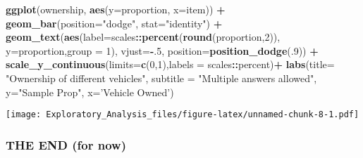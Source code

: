 \documentclass[]{article}
\newenvironment{Shaded}{\begin{snugshade}}{\end{snugshade}}
\newcommand{\KeywordTok}[1]{\textcolor[rgb]{0.13,0.29,0.53}{\textbf{#1}}}
\newcommand{\DataTypeTok}[1]{\textcolor[rgb]{0.13,0.29,0.53}{#1}}
\newcommand{\DecValTok}[1]{\textcolor[rgb]{0.00,0.00,0.81}{#1}}
\newcommand{\StringTok}[1]{\textcolor[rgb]{0.31,0.60,0.02}{#1}}
\newcommand{\OperatorTok}[1]{\textcolor[rgb]{0.81,0.36,0.00}{\textbf{#1}}}
\newcommand{\NormalTok}[1]{#1}
\begin{document}
\begin{Shaded}
\begin{Highlighting}[]
\KeywordTok{ggplot}\NormalTok{(ownership, }\KeywordTok{aes}\NormalTok{(}\DataTypeTok{y=}\NormalTok{proportion, }\DataTypeTok{x=}\NormalTok{item)) }\OperatorTok{+}\StringTok{ }
\StringTok{  }\KeywordTok{geom_bar}\NormalTok{(}\DataTypeTok{position=}\StringTok{"dodge"}\NormalTok{, }\DataTypeTok{stat=}\StringTok{"identity"}\NormalTok{) }\OperatorTok{+}
\StringTok{  }\KeywordTok{geom_text}\NormalTok{(}\KeywordTok{aes}\NormalTok{(}\DataTypeTok{label=}\NormalTok{scales}\OperatorTok{::}\KeywordTok{percent}\NormalTok{(}\KeywordTok{round}\NormalTok{(proportion,}\DecValTok{2}\NormalTok{)), }
                \DataTypeTok{y=}\NormalTok{proportion,}\DataTypeTok{group =} \DecValTok{1}\NormalTok{), }\DataTypeTok{vjust=}\OperatorTok{-}\NormalTok{.}\DecValTok{5}\NormalTok{, }\DataTypeTok{position=}\KeywordTok{position_dodge}\NormalTok{(.}\DecValTok{9}\NormalTok{)) }\OperatorTok{+}
\StringTok{  }\KeywordTok{scale_y_continuous}\NormalTok{(}\DataTypeTok{limits=}\KeywordTok{c}\NormalTok{(}\DecValTok{0}\NormalTok{,}\DecValTok{1}\NormalTok{),}\DataTypeTok{labels =}\NormalTok{ scales}\OperatorTok{::}\NormalTok{percent)}\OperatorTok{+}
\StringTok{  }\KeywordTok{labs}\NormalTok{(}\DataTypeTok{title=} \StringTok{"Ownership of different vehicles"}\NormalTok{,}
       \DataTypeTok{subtitle =} \StringTok{"Multiple answers allowed"}\NormalTok{,}
       \DataTypeTok{y=}\StringTok{"Sample Prop"}\NormalTok{,}
       \DataTypeTok{x=}\StringTok{'Vehicle Owned'}\NormalTok{)}
\end{Highlighting}
\end{Shaded}

\texttt{[image: Exploratory\_Analysis\_files/figure-latex/unnamed-chunk-8-1.pdf]}

\subsubsection{THE END (for now)}\label{the-end-for-now}
\end{document}
